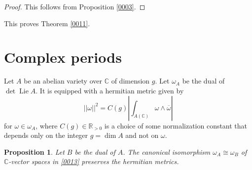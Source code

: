 \documentclass{amsart}
\newtheorem{proposition}[theorem]{Proposition}
\theoremstyle{remark}
\numberwithin{equation}{section}
\newcommand{\closure}[1]{\overline{#1}}
\newcommand{\R}{\mathbb{R}}
\newcommand{\C}{\mathbb{C}}
\DeclareMathOperator{\Lie}{Lie}
\begin{document}
\begin{proof}
	This follows from Proposition \ref{0003}.
\end{proof}

This proves Theorem \ref{0011}.


\section{Complex periods}

Let $A$ be an abelian variety over $\C$
of dimension $g$.
Let $\omega_{A}$ be the dual of $\det \Lie A$.
It is equipped with a hermitian metric given by
	\begin{equation} \label{0018}
			||\omega||^{2}
		=
			C(g)
			\left|
				\int_{A(\C)} \omega \wedge \closure{\omega}
			\right|
	\end{equation}
for $\omega \in \omega_{A}$,
where $C(g) \in \R_{> 0}$ is a choice of some normalization constant
that depends only on the integer $g = \dim A$
and not on $\omega$.

\begin{proposition} \label{0005}
	Let $B$ be the dual of $A$.
	The canonical isomorphism $\omega_{A} \cong \omega_{B}$
	of $\C$-vector spaces in \eqref{0013}
	preserves the hermitian metrics.
\end{proposition}
\end{document}
